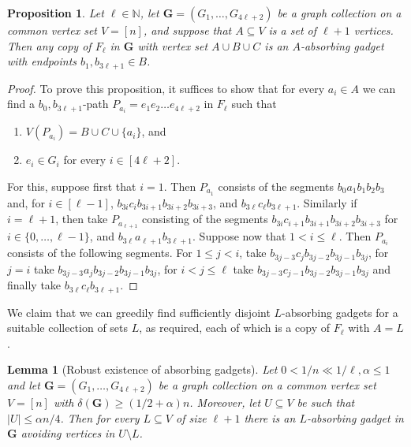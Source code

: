 \documentclass[11pt, dvipsnames]{amsart}
\theoremstyle{plain}
\newtheorem{prop}[theo]{Proposition}
\newtheorem{lemma}[theo]{Lemma}
\theoremstyle{definition}
\newcommand{\mb}[1]{\mathbb{#1}}
\newcommand{\mbf}[1]{\mathbf{#1}}
\begin{document}
\begin{prop}\label{prop:absgag}
Let $\ell\in \mb N$, let $\mathbf{G}=(G_1, \ldots, G_{4\ell+2})$ be a graph collection on a common vertex set $V=[n]$, and suppose that $A\subseteq V$ is a set of $\ell+1$ vertices. Then any copy of $F_\ell$ in $\mbf G$ with vertex set $A\cup B\cup C$ is an $A$-absorbing gadget with endpoints $b_1,b_{3\ell+1}\in B$.
\end{prop}
\begin{proof}
To prove this proposition, it suffices to show that for every $a_i\in A$ we can find a $b_0,b_{3\ell+1}$-path $P_{a_i}=e_1e_2 \ldots e_{4\ell+2}$ in $F_\ell$ such that  
\begin{enumerate}
\item $V(P_{a_i})=B\cup C\cup \{a_i\}$, and
\item $e_i \in G_i$ for every $i \in [4\ell +2]$.
\end{enumerate}

For this, suppose first that $i=1$. Then $P_{a_1}$ consists of the segments $b_0a_1b_1b_2b_3$ and, for $i \in [\ell-1]$, $b_{3i}c_{i}b_{3i+1}b_{3i+2}b_{3i+3}$, and $b_{3\ell}c_{\ell}b_{3\ell+1}$. Similarly if $i=\ell+1$, then take $P_{a_{\ell+1}}$ consisting of the segments  $b_{3i}c_{i+1}b_{3i+1}b_{3i+2}b_{3i+3}$ for $i \in \{0,\ldots, \ell-1\}$, and $b_{3\ell}a_{\ell+1}b_{3\ell+1}$. Suppose now that $1< i \leq \ell$. Then $P_{a_i}$ consists of the following segments. For $1\leq j <i$, take $b_{3j-3}c_jb_{3j-2}b_{3j-1}b_{3j}$, for $j = i$ take $b_{3j-3}a_jb_{3j-2}b_{3j-1}b_{3j}$, for $i<j \leq \ell$ take $b_{3j-3}c_{j-1}b_{3j-2}b_{3j-1}b_{3j}$ and finally take $b_{3\ell}c_{\ell}b_{3\ell+1}$.
\end{proof}

We claim that we can greedily find sufficiently disjoint $L$-absorbing gadgets for a suitable collection of sets $L$, as required, each of which is a copy of $F_\ell$ with $A=L$.

\begin{lemma}[Robust existence of absorbing gadgets]\label{lemma:absgag}
Let $0<1/n \ll 1/\ell, \alpha \leq 1$ and let $\mathbf{G}=(G_1, \ldots, G_{4\ell+2})$ be a graph collection on a common vertex set $V=[n]$ with $\delta(\mathbf{G}) \geq (1/2+\alpha)n$. Moreover, let $U \subseteq V$ be such that $|U| \leq \alpha n/4$. Then for every $L \subseteq V$ of size $\ell+1$ there is an $L$-absorbing gadget in $\mbf G$ avoiding vertices in $U\setminus L$. 
\end{lemma}
\end{document}
